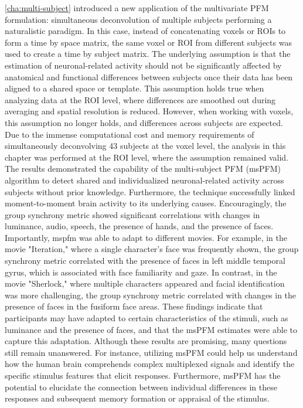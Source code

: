 \cref{cha:multi-subject}
introduced a new application of the multivariate PFM formulation: simultaneous
deconvolution of multiple subjects performing a naturalistic paradigm. In this
case, instead of concatenating voxels or ROIs to form a time by space matrix,
the same voxel or ROI from different subjects was used to create a time by
subject matrix. The underlying assumption is that the estimation of
neuronal-related activity should not be significantly affected by anatomical and
functional differences between subjects once their data has been aligned to a
shared space or template. This assumption holds true when analyzing data at the
ROI level, where differences are smoothed out during averaging and spatial
resolution is reduced. However, when working with voxels, this assumption no
longer holds, and differences across subjects are expected. Due to the immense
computational cost and memory requirements of simultaneously deconvolving 43
subjects at the voxel level, the analysis in this chapter was performed at the
ROI level, where the assumption remained valid. The results demonstrated the
capability of the multi-subject PFM (msPFM) algorithm to detect shared and
individualized neuronal-related activity across subjects without prior
knowledge. Furthermore, the technique successfully linked moment-to-moment brain
activity to its underlying causes. Encouragingly, the group synchrony metric
showed significant correlations with changes in luminance, audio, speech, the
presence of hands, and the presence of faces. Importantly, \acrshort*{mspfm} was
able to adapt to different movies. For example, in the movie "Iteration," where
a single character's face was frequently shown, the group synchrony metric
correlated with the presence of faces in left middle temporal gyrus, which is
associated with face familiarity and gaze. In contrast, in the movie "Sherlock,"
where multiple characters appeared and facial identification was more
challenging, the group synchrony metric correlated with changes in the presence
of faces in the fusiform face areas. These findings indicate that participants
may have adapted to certain characteristics of the stimuli, such as luminance
and the presence of faces, and that the msPFM estimates were able to capture
this adaptation. Although these results are promising, many questions still
remain unanswered. For instance, utilizing msPFM could help us understand how
the human brain comprehends complex multiplexed signals and identify the
specific stimulus features that elicit responses. Furthermore, msPFM has the
potential to elucidate the connection between individual differences in these
responses and subsequent memory formation or appraisal of the stimulus.


